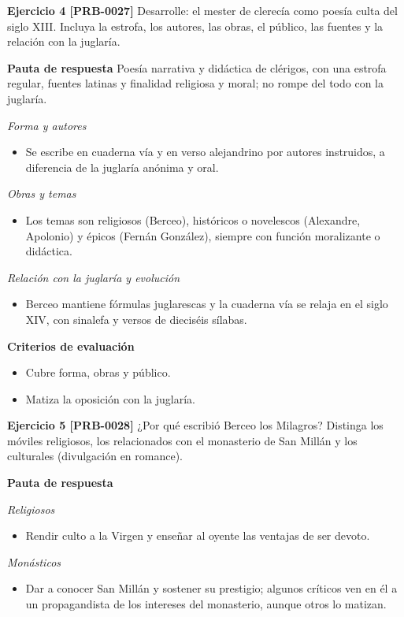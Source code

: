 \documentclass{book}
\begin{document}
\noindent\textbf{Ejercicio 4 [PRB-0027]}
Desarrolle: el mester de clerecía como poesía culta del siglo XIII. Incluya la estrofa, los autores, las obras, el público, las fuentes y la relación con la juglaría.


\noindent\textbf{Pauta de respuesta}
Poesía narrativa y didáctica de clérigos, con una estrofa regular, fuentes latinas y finalidad religiosa y moral; no rompe del todo con la juglaría.


\noindent\textit{Forma y autores}
\begin{itemize}
\item Se escribe en cuaderna vía y en verso alejandrino por autores instruidos, a diferencia de la juglaría anónima y oral.
\end{itemize}

\noindent\textit{Obras y temas}
\begin{itemize}
\item Los temas son religiosos (Berceo), históricos o novelescos (Alexandre, Apolonio) y épicos (Fernán González), siempre con función moralizante o didáctica.
\end{itemize}

\noindent\textit{Relación con la juglaría y evolución}
\begin{itemize}
\item Berceo mantiene fórmulas juglarescas y la cuaderna vía se relaja en el siglo XIV, con sinalefa y versos de dieciséis sílabas.
\end{itemize}

\noindent\textbf{Criterios de evaluación}
\begin{itemize}
\item Cubre forma, obras y público.
\item Matiza la oposición con la juglaría.
\end{itemize}

\noindent\textbf{Ejercicio 5 [PRB-0028]}
¿Por qué escribió Berceo los Milagros? Distinga los móviles religiosos, los relacionados con el monasterio de San Millán y los culturales (divulgación en romance).


\noindent\textbf{Pauta de respuesta}

\noindent\textit{Religiosos}
\begin{itemize}
\item Rendir culto a la Virgen y enseñar al oyente las ventajas de ser devoto.
\end{itemize}

\noindent\textit{Monásticos}
\begin{itemize}
\item Dar a conocer San Millán y sostener su prestigio; algunos críticos ven en él a un propagandista de los intereses del monasterio, aunque otros lo matizan.
\end{itemize}
\end{document}
